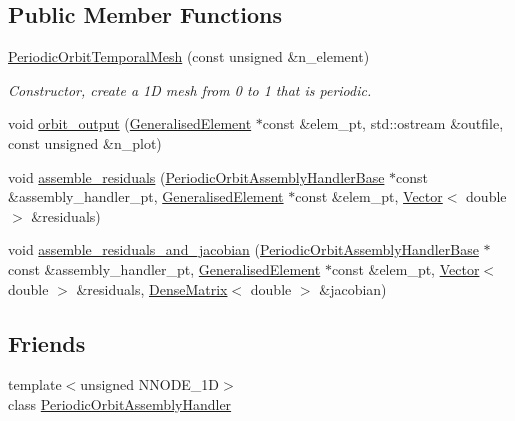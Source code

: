 \subsection*{Public Member Functions}
\begin{DoxyCompactItemize}
\item 
\hyperlink{classoomph_1_1PeriodicOrbitTemporalMesh_a0060f76881f7125a298926674ddbb15e}{Periodic\+Orbit\+Temporal\+Mesh} (const unsigned \&n\+\_\+element)
\begin{DoxyCompactList}\small\item\em Constructor, create a 1D mesh from 0 to 1 that is periodic. \end{DoxyCompactList}\item 
void \hyperlink{classoomph_1_1PeriodicOrbitTemporalMesh_a8126152646e3eaed0ab5555794a20d49}{orbit\+\_\+output} (\hyperlink{classoomph_1_1GeneralisedElement}{Generalised\+Element} $\ast$const \&elem\+\_\+pt, std\+::ostream \&outfile, const unsigned \&n\+\_\+plot)
\item 
void \hyperlink{classoomph_1_1PeriodicOrbitTemporalMesh_af1829044fa15d410cbd5d340d9c9e458}{assemble\+\_\+residuals} (\hyperlink{classoomph_1_1PeriodicOrbitAssemblyHandlerBase}{Periodic\+Orbit\+Assembly\+Handler\+Base} $\ast$const \&assembly\+\_\+handler\+\_\+pt, \hyperlink{classoomph_1_1GeneralisedElement}{Generalised\+Element} $\ast$const \&elem\+\_\+pt, \hyperlink{classoomph_1_1Vector}{Vector}$<$ double $>$ \&residuals)
\item 
void \hyperlink{classoomph_1_1PeriodicOrbitTemporalMesh_a5ca70a80e8673d43a0c5c15b021d10cd}{assemble\+\_\+residuals\+\_\+and\+\_\+jacobian} (\hyperlink{classoomph_1_1PeriodicOrbitAssemblyHandlerBase}{Periodic\+Orbit\+Assembly\+Handler\+Base} $\ast$const \&assembly\+\_\+handler\+\_\+pt, \hyperlink{classoomph_1_1GeneralisedElement}{Generalised\+Element} $\ast$const \&elem\+\_\+pt, \hyperlink{classoomph_1_1Vector}{Vector}$<$ double $>$ \&residuals, \hyperlink{classoomph_1_1DenseMatrix}{Dense\+Matrix}$<$ double $>$ \&jacobian)
\end{DoxyCompactItemize}
\subsection*{Friends}
\begin{DoxyCompactItemize}
\item 
{\footnotesize template$<$unsigned N\+N\+O\+D\+E\+\_\+1D$>$ }\\class \hyperlink{classoomph_1_1PeriodicOrbitTemporalMesh_a2cbe986bcd27c28d5de7ada068d3d94c}{Periodic\+Orbit\+Assembly\+Handler}
\end{DoxyCompactItemize}
